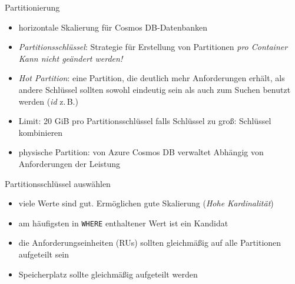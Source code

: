 \begin{flashcard}[Definition]{Partitionierung}
    \begin{itemize}
        \item horizontale Skalierung für Cosmos DB-Datenbanken
        \item \emph{Partitionsschlüssel}: Strategie für Erstellung von Partitionen \emph{pro Container}\newline
            \emph{Kann nicht geändert werden!}
        \item \emph{Hot Partition}: eine Partition, die deutlich mehr Anforderungen erhält, als andere\newline
            Schlüssel sollten sowohl eindeutig sein als auch zum Suchen benutzt werden (\emph{id} z.\,B.)
        \item Limit: 20 GiB pro Partitionsschlüssel\newline
            falls Schlüssel zu groß: Schlüssel kombinieren
        \item physische Partition: von Azure Cosmos DB verwaltet \newline
            Abhängig von Anforderungen der Leistung
    \end{itemize}
\end{flashcard}

\begin{flashcard}[Definition]{Partitionsschlüssel auswählen}
    \begin{itemize}
        \item viele Werte sind gut. Ermöglichen gute Skalierung (\emph{Hohe Kardinalität})
        \item am häufigsten in \texttt{WHERE} enthaltener Wert ist ein Kandidat
        \item die Anforderungseinheiten (RUs) sollten gleichmäßig auf alle Partitionen aufgeteilt sein
        \item Speicherplatz sollte gleichmäßig aufgeteilt werden
    \end{itemize}
\end{flashcard}


